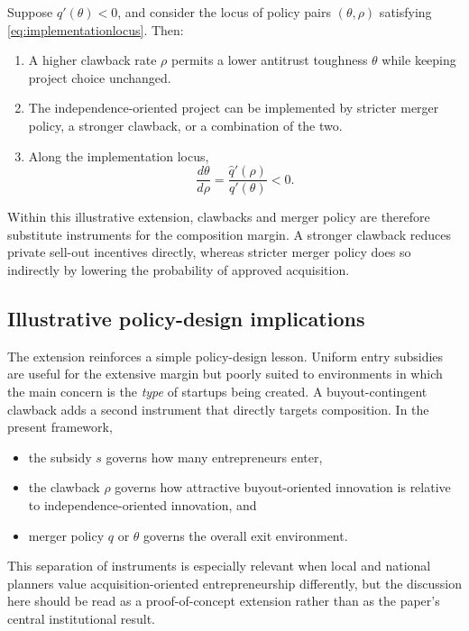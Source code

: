 \begin{proposition}\label{prop:instrumentsubstitution}
Suppose \(q'(\theta)<0\), and consider the locus of policy pairs \((\theta,\rho)\) satisfying \eqref{eq:implementationlocus}. Then:
\begin{enumerate}
    \item A higher clawback rate \(\rho\) permits a lower antitrust toughness \(\theta\) while keeping project choice unchanged.
    \item The independence-oriented project can be implemented by stricter merger policy, a stronger clawback, or a combination of the two.
    \item Along the implementation locus,
    \begin{equation}\label{eq:dthetadrho}
        \frac{d\theta}{d\rho}
        =
        \frac{\hat q'(\rho)}{q'(\theta)}
        <0.
    \end{equation}
\end{enumerate}
\end{proposition}

Within this illustrative extension, clawbacks and merger policy are therefore substitute instruments for the composition margin. A stronger clawback reduces private sell-out incentives directly, whereas stricter merger policy does so indirectly by lowering the probability of approved acquisition.

\subsection{Illustrative policy-design implications}

The extension reinforces a simple policy-design lesson. Uniform entry subsidies are useful for the extensive margin but poorly suited to environments in which the main concern is the \emph{type} of startups being created. A buyout-contingent clawback adds a second instrument that directly targets composition. In the present framework,
\begin{itemize}
    \item the subsidy \(s\) governs how many entrepreneurs enter,
    \item the clawback \(\rho\) governs how attractive buyout-oriented innovation is relative to independence-oriented innovation, and
    \item merger policy \(q\) or \(\theta\) governs the overall exit environment.
\end{itemize}
This separation of instruments is especially relevant when local and national planners value acquisition-oriented entrepreneurship differently, but the discussion here should be read as a proof-of-concept extension rather than as the paper's central institutional result.
